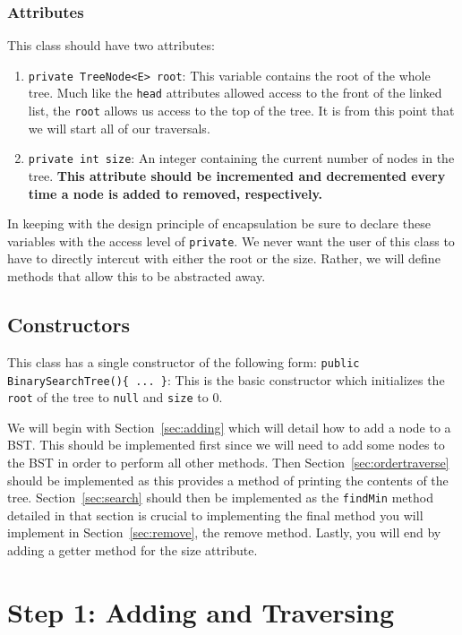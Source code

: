 \documentclass[a4paper]{article}
\begin{document}
\subsubsection{Attributes}
This class should have two attributes:
\begin{enumerate}
    \item \lstinline|private TreeNode<E> root|: This variable contains the root of the whole tree. Much like the \lstinline|head| attributes allowed access to the front of the linked list, the \lstinline|root| allows us access to the top of the tree. It is from this point that we will start all of our traversals.
    \item \lstinline|private int size|: An integer containing the current number of nodes in the tree. \textbf{This attribute should be incremented and decremented every time a node is added to removed, respectively.}
\end{enumerate}
In keeping with the design principle of encapsulation be sure to declare
these variables with the access level of \lstinline|private|. We never want 
the user of this class to have to directly intercut with either the root or
the size. Rather, we will define methods that allow this to be abstracted away.

\subsection{Constructors}
This class has a single constructor of the following form: \lstinline|public BinarySearchTree(){ ... }|: This is the basic constructor which initializes the
\lstinline|root| of the tree to \lstinline|null| and \lstinline|size| to 0.


We will begin with Section~\ref{sec:adding} which will detail how to add a node
to a BST. This should be implemented first since we will need to add some nodes
to the BST in order to perform all other methods. Then Section~\ref{sec:ordertraverse}
should be implemented as this provides a method of printing the contents of the tree.
Section~\ref{sec:search} should then be implemented as the \lstinline|findMin| method 
detailed in that section is crucial to implementing the final method you will
implement in Section~\ref{sec:remove}, the remove method. Lastly, you will end
by adding a getter method for the size attribute.


\section{Step 1: Adding and Traversing}
\end{document}
